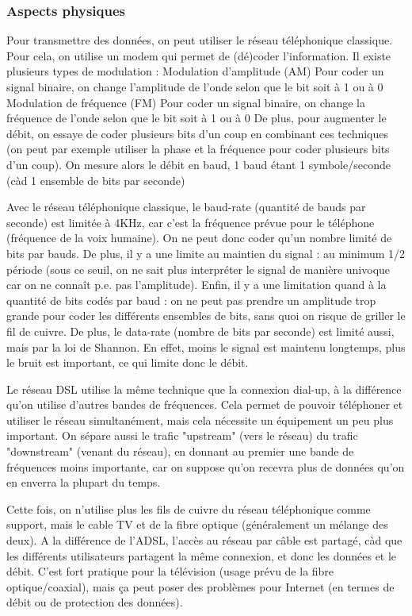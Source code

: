 \subsubsection{Aspects physiques}
Pour transmettre des données, on peut utiliser le réseau téléphonique classique. Pour
cela, on utilise un modem qui permet de (dé)coder l'information. Il existe plusieurs types de modulation :
Modulation d'amplitude (AM) Pour coder un signal binaire, on change l'amplitude
de l'onde selon que le bit soit à 1 ou à 0
Modulation de fréquence (FM) Pour coder un signal binaire, on change la fréquence
de l'onde selon que le bit soit à 1 ou à 0
De plus, pour augmenter le débit, on essaye de coder plusieurs bits d'un coup en combinant
ces techniques (on peut par exemple utiliser la phase et la fréquence pour coder
plusieurs bits d'un coup). On mesure alors le débit en baud, 1 baud étant 1 symbole/seconde
(càd 1 ensemble de bits par seconde)


Avec le réseau téléphonique classique, le baud-rate (quantité de bauds par seconde)
est limitée à 4KHz, car c'est la fréquence prévue pour le téléphone (fréquence de la voix
humaine). On ne peut donc coder qu'un nombre limité de bits par bauds. De plus, il y a
une limite au maintien du signal : au minimum 1/2 période (sous ce seuil, on ne sait plus
interpréter le signal de manière univoque car on ne connaît p.e. pas l'amplitude). Enfin,
il y a une limitation quand à la quantité de bits codés par baud : on ne peut pas prendre
un amplitude trop grande pour coder les différents ensembles de bits, sans quoi on risque
de griller le fil de cuivre.
De plus, le data-rate (nombre de bits par seconde) est limité aussi, mais par la loi de
Shannon. En effet, moins le signal est maintenu longtemps, plus le bruit est important,
ce qui limite donc le débit.



Le réseau DSL utilise la même technique que la connexion dial-up, à la différence
qu'on utilise d'autres bandes de fréquences. Cela permet de pouvoir téléphoner et utiliser
le réseau simultanément, mais cela nécessite un équipement un peu plus important. On
sépare aussi le trafic "upstream" (vers le réseau) du trafic "downstream" (venant du
réseau), en donnant au premier une bande de fréquences moins importante, car on suppose
qu'on recevra plus de données qu'on en enverra la plupart du temps.



Cette fois, on n'utilise plus les fils de cuivre du réseau téléphonique comme support,
mais le cable TV et de la fibre optique (généralement un mélange des deux). A la différence
de l'ADSL, l'accès au réseau par câble est partagé, càd que les différents utilisateurs
partagent la même connexion, et donc les données et le débit. C'est fort pratique pour
la télévision (usage prévu de la fibre optique/coaxial), mais ça peut poser des problèmes
pour Internet (en termes de débit ou de protection des données).


